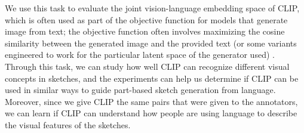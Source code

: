 We use this task to evaluate the joint vision-language embedding space of CLIP, which is often used as part of the objective function for models that generate image from text; the objective function often involves maximizing the cosine similarity between the generated image and the provided text (or some variants engineered to work for the particular latent space of the generator used) \citep{clipDrawPaper,styleCLIPPaper,styleganNadaPaper,dalle2Paper}. 
Through this task, we can study how well CLIP can recognize different visual concepts in sketches, and the experiments can help us determine if CLIP can be used in similar ways to guide part-based sketch generation from language. Moreover, since we give CLIP the same pairs that were given to the annotators, we can learn if CLIP can understand how people are using language to describe the visual features of the sketches. 
